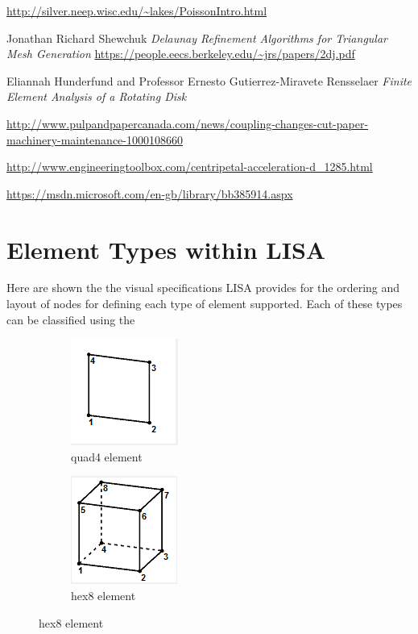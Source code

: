 \begin{changemargin}{\CMwidth}{\CMheight}
\begin{thebibliography}{9}
 \url{http://silver.neep.wisc.edu/~lakes/PoissonIntro.html}

 Jonathan Richard Shewchuk \emph{Delaunay Refinement Algorithms
for Triangular Mesh Generation} \url{https://people.eecs.berkeley.edu/~jrs/papers/2dj.pdf}

 Eliannah Hunderfund and Professor Ernesto Gutierrez-Miravete Rensselaer 
\emph{Finite Element Analysis of a Rotating Disk}


 \url{http://www.pulpandpapercanada.com/news/coupling-changes-cut-paper-machinery-maintenance-1000108660}

 \url{http://www.engineeringtoolbox.com/centripetal-acceleration-d_1285.html}

 \url{https://msdn.microsoft.com/en-gb/library/bb385914.aspx}


\end{thebibliography}
\appendix

\section{Element Types within LISA}
Here are shown the the visual specifications LISA provides for the ordering and layout of nodes for defining each type of element supported. Each of these types can be classified using the

\begin{figure}[!h]
\centering
\begin{subfigure}{.5\textwidth}
  \centering
  \includegraphics[width=0.3\linewidth]{../Graphics/LISA-quad4.png}
  \caption{quad4 element}
  \label{fig:sub1}
\end{subfigure}%
\begin{subfigure}{.5\textwidth}
  \centering
  \includegraphics[width=0.3\linewidth]{../Graphics/LISA-hex8.png}
  \caption{hex8 element}
  \label{fig:sub2}
\end{subfigure}
\label{fig:test}
\end{figure}



\end{changemargin}
